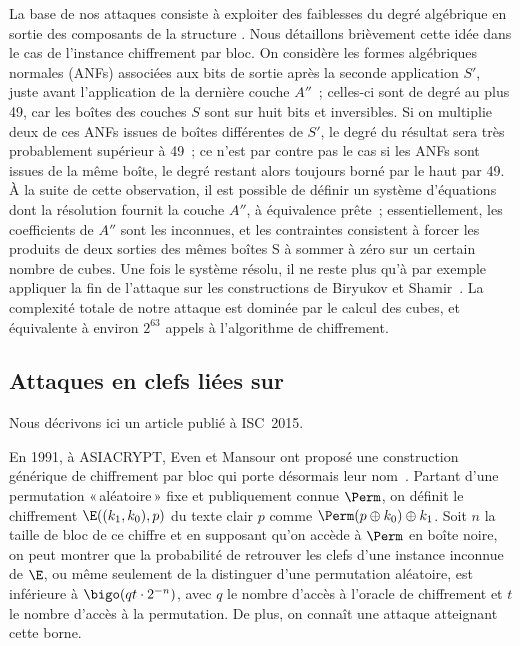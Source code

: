 La base de nos attaques consiste à exploiter des faiblesses du degré algébrique en sortie des composants de la structure \asasa. Nous détaillons brièvement cette idée dans le cas de l'instance
chiffrement par bloc. On considère les formes algébriques normales (ANFs) associées aux bits de sortie après la seconde application $S'$,
juste avant l'application de la dernière couche $A''$~;
celles-ci sont de degré au plus 49, car les boîtes des couches $S$ sont sur huit bits et inversibles. Si on multiplie deux de ces ANFs issues de boîtes différentes de $S'$, le degré du résultat
sera très probablement supérieur à 49~; ce n'est par contre pas le cas si les ANFs sont issues de la même boîte, le degré restant alors toujours borné par le haut par 49.
À la suite de cette observation, il est possible de définir un système d'équations dont la résolution fournit la couche $A''$, à équivalence prête~;
essentiellement,
les coefficients de $A''$ sont les inconnues, et les contraintes consistent à forcer les produits de deux sorties des mêmes boîtes S à sommer à zéro sur un certain nombre de cubes. Une fois le système résolu, il ne reste plus qu'à par exemple
appliquer la fin de l'attaque sur les constructions \sasas de Biryukov et Shamir~\cite{DBLP:conf/eurocrypt/BiryukovS01}. La complexité totale de notre attaque est dominée par le calcul
des cubes, et équivalente à environ $2^{63}$ appels à l'algorithme de chiffrement.

\subsection{Attaques en clefs liées sur \proestotr \cite{DBLP:conf/isw/Karpman15}}

Nous décrivons ici un article publié à ISC~2015.

\medskip

En 1991, à ASIACRYPT, Even et Mansour ont proposé une construction générique de chiffrement par bloc qui porte désormais leur nom~\cite{EM}. Partant d'une permutation «\,aléatoire\,» fixe
et publiquement connue $\Perm$, on définit le chiffrement $\E((k_1,k_0),p)$ du texte clair $p$ comme $\Perm(p \oplus k_0) \oplus k_1$. Soit $n$ la taille de bloc de ce chiffre
et en supposant qu'on accède à $\Perm$ en boîte noire, on peut montrer que la probabilité de retrouver les clefs d'une instance inconnue de $\E$,
ou même seulement de la distinguer d'une permutation aléatoire, est inférieure à
$\bigo(qt \cdot 2^{-n})$, avec $q$ le nombre d'accès à l'oracle de chiffrement et $t$ le nombre d'accès à la permutation. De plus, on connaît une attaque atteignant cette borne.


